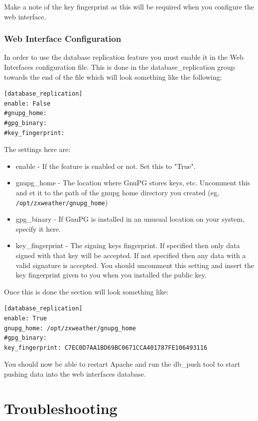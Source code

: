 \documentclass[a4paper,10pt,draft]{book}
\begin{document}
Make a note of the key fingerprint as this will be required when you configure the web interface.

\label{sec_dbr_web_setup}
\subsection{Web Interface Configuration}

In order to use the database replication feature you must enable it in the Web Interfaces configuration file. This is done in the database\_replication group towards the end of the file which will look something like the following:
\begin{verbatim}
[database_replication]
enable: False
#gnupg_home:
#gpg_binary:
#key_fingerprint: 
\end{verbatim}

The settings here are:
\begin{itemize}
\item enable - If the feature is enabled or not. Set this to "True".
\item gnupg\_home - The location where GnuPG stores keys, etc. Uncomment this and et it to the path of the gnupg home directory you created (eg, \verb|/opt/zxweather/gnupg_home|)
\item gpg\_binary - If GnuPG is installed in an unusual location on your system, specify it here.
\item key\_fingerprint - The signing keys fingerprint. If specified then only data signed with that key will be accepted. If not specified then any data with a valid signature is accepted. You should uncomment this setting and insert the key fingerprint given to you when you installed the public key.
\end{itemize}

Once this is done the section will look something like:
\begin{verbatim}
[database_replication]
enable: True
gnupg_home: /opt/zxweather/gnupg_home
#gpg_binary:
key_fingerprint: C7EC0D7AA1BD69BC0671CCA401787FE106493116
\end{verbatim}

You should now be able to restart Apache and run the db\_push tool to start pushing data into the web interfaces database.

\chapter{Troubleshooting}
\end{document}
